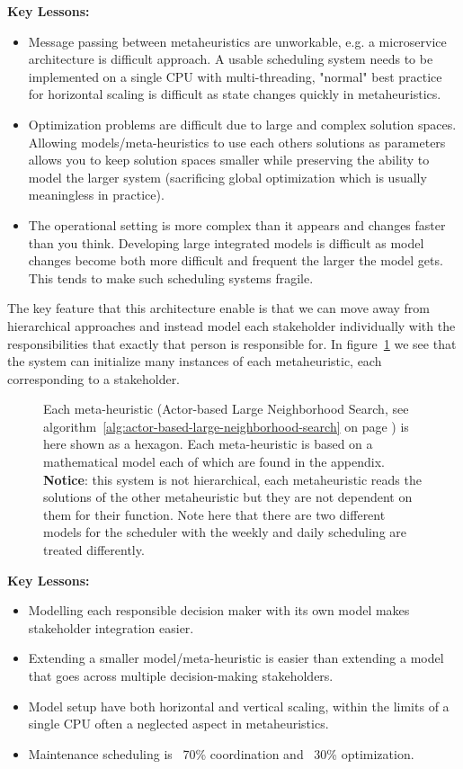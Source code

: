 \textbf{Key Lessons:}
\begin{itemize}
	\item Message passing between metaheuristics are unworkable, e.g. a microservice architecture is difficult approach. A usable scheduling
	      system needs to be implemented on a single CPU with multi-threading, "normal" best practice for horizontal scaling is difficult as 
		  state changes quickly in metaheuristics. 
	\item Optimization problems are difficult due to large and complex solution spaces. Allowing models/meta-heuristics
		  to use each others solutions as parameters allows you to keep solution spaces smaller while preserving the 
		  ability to model the larger system (sacrificing global optimization which is usually meaningless in practice).
	\item The operational setting is more complex than it appears and changes faster than you think. Developing large integrated models 
		  is difficult as model changes become both more difficult and frequent the larger the model gets. This tends to make
		  such scheduling systems fragile.
\end{itemize}

The key feature that this architecture enable is that we can move away from hierarchical approaches and 
instead model each stakeholder individually with the responsibilities that exactly that person is responsible 
for. In figure~\ref{fig:model-setup:hexagon} we see that the system can initialize many instances of each metaheuristic, each corresponding to a stakeholder. 

\begin{figure}[H]
	
	\centering
	\drawModelSetupHexagon
	\caption{
		Each meta-heuristic (Actor-based Large Neighborhood Search, see algorithm~\ref{alg:actor-based-large-neighborhood-search} on page \pageref{alg:actor-based-large-neighborhood-search}) is here shown as a hexagon.
		Each meta-heuristic is based on a mathematical model each of which are found in the appendix. \textbf{Notice}: this system is not 
		hierarchical, each metaheuristic reads the solutions of the other metaheuristic but they are not dependent on them for their 
		function. Note here that there are two different models for the scheduler with the weekly and daily scheduling are treated differently.
	}
	\label{fig:model-setup:hexagon}
\end{figure}

\textbf{Key Lessons:}
\begin{itemize}
	\item Modelling each responsible decision maker with its own model makes stakeholder integration easier.
	\item Extending a smaller model/meta-heuristic is easier than extending a model that goes across multiple decision-making stakeholders.
	\item Model setup have both horizontal and vertical scaling, within the limits of a single CPU often a neglected aspect in metaheuristics. 
	\item Maintenance scheduling is ~70\% coordination and ~30\% optimization.
\end{itemize}

